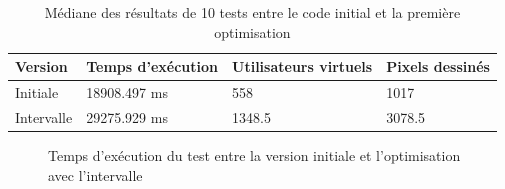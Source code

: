 





\begin{table}[H]
  \centering
  \begin{tabular}{|l|l|l|l|}
    \hline
    \textbf{Version} & \textbf{Temps d'exécution} & \textbf{Utilisateurs virtuels} & \textbf{Pixels dessinés} \\ \hline
    Initiale         & 18908.497 ms               & 558                            & 1017                     \\ \hline
    Intervalle       & 29275.929 ms               & 1348.5                         & 3078.5                   \\ \hline
  \end{tabular}
  \caption{Médiane des résultats de 10 tests entre le code initial et la première optimisation}
  \label{table:v2}
\end{table}

\begin{figure}[H]
  \centering
  \caption{Temps d'exécution du test entre la version initiale et l'optimisation avec l'intervalle}
  \label{fig:chart-opti-initial-interval-duration}
\end{figure}


